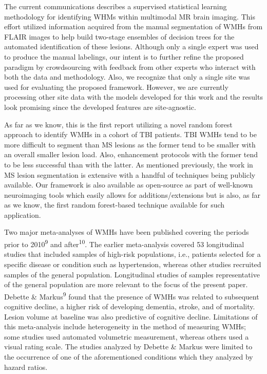 \documentclass[11pt,]{article}
\begin{document}
The current communications describes a supervised statistical learning
methodology for identifying WHMs within multimodal MR brain imaging.
This effort utilized information acquired from the manual segmentation
of WMHs from FLAIR images to help build two-stage ensembles of decision
trees for the automated identification of these lesions. Although only a
single expert was used to produce the manual labelings, our intent is to
further refine the proposed paradigm by crowdsourcing with feedback from
other experts who interact with both the data and methodology. Also, we
recognize that only a single site was used for evaluating the proposed
framework. However, we are currently processing other site data with the
models developed for this work and the results look promising since the
developed features are site-agnostic.

As far as we know, this is the first report utilizing a novel random
forest approach to identify WMHs in a cohort of TBI patients. TBI WMHs
tend to be more difficult to segment than MS lesions as the former tend
to be smaller with an overall smaller lesion load. Also, enhancement
protocols with the former tend to be less successful than with the
latter. As mentioned previously, the work in MS lesion segmentation is
extensive with a handful of techniques being publicly available. Our
framework is also available as open-source as part of well-known
neuroimaging tools which easily allows for additions/extensions but is
also, as far as we know, the first random forest-based technique
available for such application.

Two major meta-analyses of WMHs have been published covering the periods
prior to 2010\textsuperscript{9} and after\textsuperscript{10}. The
earlier meta-analysis covered 53 longitudinal studies that included
samples of high-risk populations, i.e., patients selected for a specific
disease or condition such as hypertension, whereas other studies
recruited samples of the general population. Longitudinal studies of
samples representative of the general population are more relevant to
the focus of the present paper. Debette \& Markus\textsuperscript{9}
found that the presence of WMHs was related to subsequent cognitive
decline, a higher risk of developing dementia, stroke, and of mortality.
Lesion volume at baseline was also predictive of cognitive decline.
Limitations of this meta-analysis include heterogeneity in the method of
measuring WMHs; some studies used automated volumetric measurement,
whereas others used a visual rating scale. The studies analyzed by
Debette \& Markus were limited to the occurrence of one of the
aforementioned conditions which they analyzed by hazard ratios.
\end{document}
